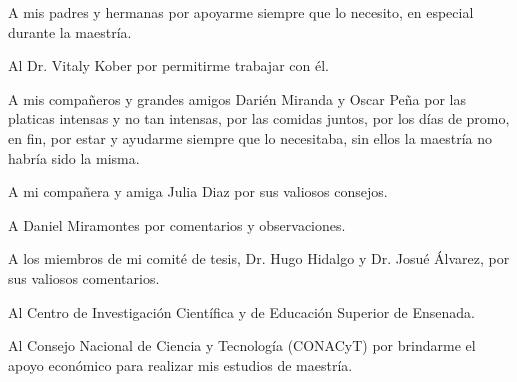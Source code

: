 

A mis padres y hermanas por apoyarme siempre que lo necesito, en especial durante la maestría. 
\bigskip 

Al Dr. Vitaly Kober por permitirme trabajar con él. 
\bigskip

A mis compañeros y grandes amigos Darién Miranda y Oscar Peña por las platicas intensas y no tan intensas, por las comidas juntos, por los días de promo, en fin, por estar y ayudarme siempre que lo necesitaba, sin ellos la maestría no habría sido la misma.    
\bigskip 

A mi compañera y amiga Julia Diaz por sus valiosos consejos.   
\bigskip

A Daniel Miramontes por comentarios y observaciones.  
\bigskip 

A los miembros de mi comité de tesis, Dr. Hugo Hidalgo y Dr. Josu\'e \'Alvarez, por sus valiosos comentarios.  
\bigskip
 
Al Centro de Investigación Científica y de Educación Superior de Ensenada.
\bigskip

Al Consejo Nacional de Ciencia y Tecnología (CONACyT) por brindarme el apoyo econ\'omico para realizar mis estudios de maestría.
